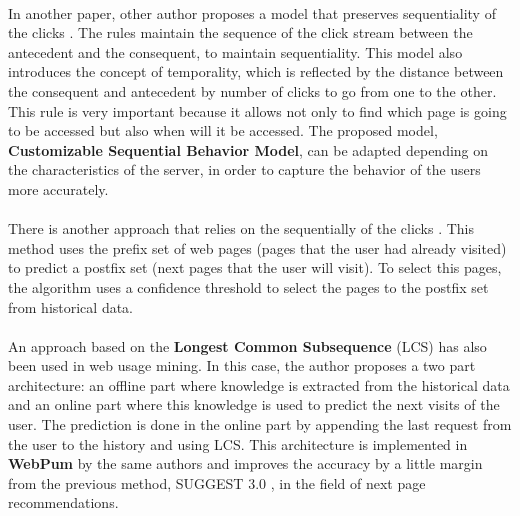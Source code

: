 \paragraph{}

In another paper, other author proposes a model that preserves sequentiality of
the clicks \cite{Frias-Martinez2003}. The rules maintain the sequence of the
click stream between the antecedent and the consequent, to maintain
sequentiality. This model also introduces the concept of temporality, which is
reflected by the distance between the consequent and antecedent by number of
clicks to go from one to the other. This rule is very important because it
allows not only to find which page is  going to be accessed but also when will
it be accessed. The proposed model, \textbf{Customizable Sequential Behavior
Model}, can be adapted depending on the characteristics of the server, in order
to capture the behavior of the users more accurately.

\paragraph{}

There is another approach that relies on the sequentially of the clicks
\cite{Jan:2007:WUB:1353862.1353874}. This method uses the prefix set of web
pages (pages that the user had already visited) to predict a postfix set (next
pages that the user will visit). To select this pages, the algorithm uses a
confidence threshold to select the pages to the postfix set from historical
data.


\paragraph{}

An approach based on the \textbf{Longest Common Subsequence} (LCS)
\cite{4631852} has also been used in web usage mining. In this case, the author
proposes a two part architecture: an offline part where knowledge is extracted
from the historical data and an online part where this knowledge is used to
predict the next visits of the user. The prediction is done in the online part
by appending the last request from the user to the history and using LCS. This
architecture is implemented in \textbf{WebPum} \cite{Jalali20106201} by the same
authors and improves the accuracy by a little margin from the previous method,
SUGGEST 3.0 \cite{1410804}, in the field of next page recommendations.

\paragraph{}

